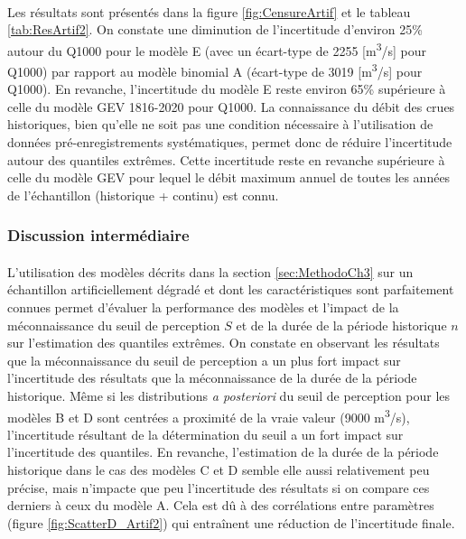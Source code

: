 	\paragraph{}
	Les résultats sont présentés dans la figure \ref{fig:CensureArtif} et le tableau \ref{tab:ResArtif2}. On constate une diminution de l'incertitude d'environ 25\% autour du Q1000 pour le modèle E (avec un écart-type de 2255 [m\textsuperscript{3}/s] pour Q1000) par rapport au modèle binomial A (écart-type de 3019 [m\textsuperscript{3}/s] pour Q1000). En revanche, l'incertitude du modèle E reste environ 65\% supérieure à celle du modèle GEV 1816-2020 pour Q1000. La connaissance du débit des crues historiques, bien qu'elle ne soit pas une condition nécessaire à l'utilisation de données pré-enregistrements systématiques, permet donc de réduire l'incertitude autour des quantiles extrêmes. Cette incertitude reste en revanche supérieure à celle du modèle GEV pour lequel le débit maximum annuel de toutes les années de l'échantillon (historique + continu) est connu.	

\FloatBarrier
	\subsubsection{Discussion intermédiaire}
	
	\paragraph{} L'utilisation des modèles décrits dans la section \ref{sec:MethodoCh3} sur un échantillon artificiellement dégradé et dont les caractéristiques sont parfaitement connues permet d'évaluer la performance des modèles et l'impact de la méconnaissance du seuil de perception $S$ et de la durée de la période historique $n$ sur l'estimation des quantiles extrêmes. On constate en observant les résultats que la méconnaissance du seuil de perception a un plus fort impact sur l'incertitude des résultats que la méconnaissance de la durée de la période historique. Même si les distributions \textit{a posteriori} du seuil de perception pour les modèles B et D sont centrées a proximité de la vraie valeur (9000 m\textsuperscript{3}/s), l'incertitude résultant de la détermination du seuil a un fort impact sur l'incertitude des quantiles. En revanche, l'estimation de la durée de la période historique dans le cas des modèles C et D semble elle aussi relativement peu précise, mais n'impacte que peu l'incertitude des résultats si on compare ces derniers à ceux du modèle A. Cela est dû à des corrélations entre paramètres (figure \ref{fig:ScatterD_Artif2}) qui entraînent une réduction de l'incertitude finale.
	 
